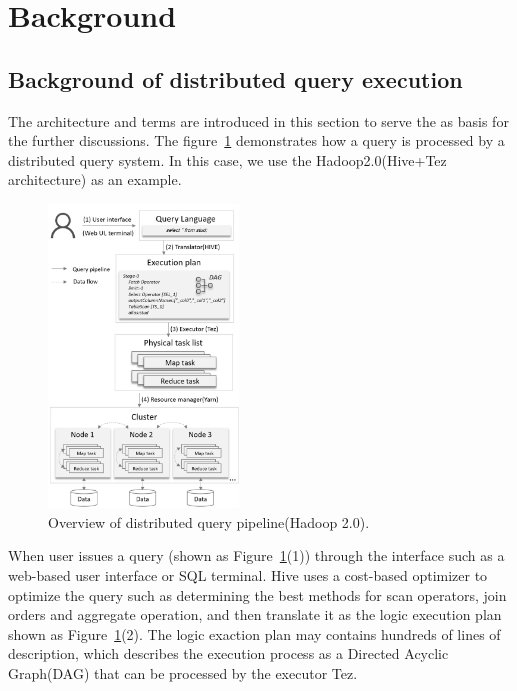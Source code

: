 \section{Background}
\subsection{Background of distributed query execution}
The architecture and terms are introduced in this section to serve the as basis for the further discussions. 
The figure~\ref{fig:architecture} demonstrates how a query is processed by a distributed query system. In this case, we use the Hadoop2.0(Hive+Tez architecture) as an example.

\begin{figure}[t]
	\centering
	\includegraphics[width=0.45\textwidth]{figures/background/arc.png}
	\vspace{-3mm}
	\caption{Overview of distributed query pipeline(Hadoop 2.0).}
	\label{fig:architecture}
	\vspace{-3mm}
\end{figure}



When user issues a query (shown as Figure~\ref{fig:architecture}(1)) through the interface such as a web-based user interface or SQL terminal. 
Hive uses a cost-based optimizer to optimize the query such as determining the best methods for scan operators, join orders and aggregate operation, and then translate it as the logic execution plan shown as Figure~\ref{fig:architecture}(2). The logic exaction plan may contains hundreds of lines of description, which describes the execution process as a Directed Acyclic Graph(DAG) that can be processed by the executor Tez. 

